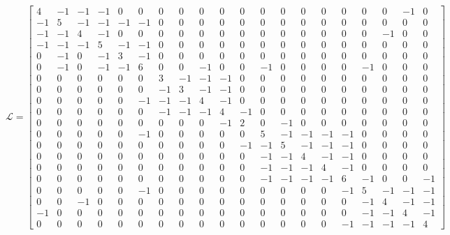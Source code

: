 \documentclass[a3paper,14pt]{extarticle}
\begin{document}
$$\mathcal{L} = \left[\begin{array}{rrrrrrrrrrrrrrrrrrrr}
    4 & -1 & -1 & -1 & 0 & 0 & 0 & 0 & 0 & 0 & 0 & 0 & 0 & 0 & 0 & 0 & 0 & 0 & -1 & 0 \\
    -1 & 5 & -1 & -1 & -1 & -1 & 0 & 0 & 0 & 0 & 0 & 0 & 0 & 0 & 0 & 0 & 0 & 0 & 0 & 0 \\
    -1 & -1 & 4 & -1 & 0 & 0 & 0 & 0 & 0 & 0 & 0 & 0 & 0 & 0 & 0 & 0 & 0 & -1 & 0 & 0 \\
    -1 & -1 & -1 & 5 & -1 & -1 & 0 & 0 & 0 & 0 & 0 & 0 & 0 & 0 & 0 & 0 & 0 & 0 & 0 & 0 \\
    0 & -1 & 0 & -1 & 3 & -1 & 0 & 0 & 0 & 0 & 0 & 0 & 0 & 0 & 0 & 0 & 0 & 0 & 0 & 0 \\
    0 & -1 & 0 & -1 & -1 & 6 & 0 & 0 & -1 & 0 & 0 & -1 & 0 & 0 & 0 & 0 & -1 & 0 & 0 & 0 \\
    0 & 0 & 0 & 0 & 0 & 0 & 3 & -1 & -1 & -1 & 0 & 0 & 0 & 0 & 0 & 0 & 0 & 0 & 0 & 0 \\
    0 & 0 & 0 & 0 & 0 & 0 & -1 & 3 & -1 & -1 & 0 & 0 & 0 & 0 & 0 & 0 & 0 & 0 & 0 & 0 \\
    0 & 0 & 0 & 0 & 0 & -1 & -1 & -1 & 4 & -1 & 0 & 0 & 0 & 0 & 0 & 0 & 0 & 0 & 0 & 0 \\
    0 & 0 & 0 & 0 & 0 & 0 & -1 & -1 & -1 & 4 & -1 & 0 & 0 & 0 & 0 & 0 & 0 & 0 & 0 & 0 \\
    0 & 0 & 0 & 0 & 0 & 0 & 0 & 0 & 0 & -1 & 2 & 0 & -1 & 0 & 0 & 0 & 0 & 0 & 0 & 0 \\
    0 & 0 & 0 & 0 & 0 & -1 & 0 & 0 & 0 & 0 & 0 & 5 & -1 & -1 & -1 & -1 & 0 & 0 & 0 & 0 \\
    0 & 0 & 0 & 0 & 0 & 0 & 0 & 0 & 0 & 0 & -1 & -1 & 5 & -1 & -1 & -1 & 0 & 0 & 0 & 0 \\
    0 & 0 & 0 & 0 & 0 & 0 & 0 & 0 & 0 & 0 & 0 & -1 & -1 & 4 & -1 & -1 & 0 & 0 & 0 & 0 \\
    0 & 0 & 0 & 0 & 0 & 0 & 0 & 0 & 0 & 0 & 0 & -1 & -1 & -1 & 4 & -1 & 0 & 0 & 0 & 0 \\
    0 & 0 & 0 & 0 & 0 & 0 & 0 & 0 & 0 & 0 & 0 & -1 & -1 & -1 & -1 & 6 & -1 & 0 & 0 & -1 \\
    0 & 0 & 0 & 0 & 0 & -1 & 0 & 0 & 0 & 0 & 0 & 0 & 0 & 0 & 0 & -1 & 5 & -1 & -1 & -1 \\
    0 & 0 & -1 & 0 & 0 & 0 & 0 & 0 & 0 & 0 & 0 & 0 & 0 & 0 & 0 & 0 & -1 & 4 & -1 & -1 \\
    -1 & 0 & 0 & 0 & 0 & 0 & 0 & 0 & 0 & 0 & 0 & 0 & 0 & 0 & 0 & 0 & -1 & -1 & 4 & -1 \\
    0 & 0 & 0 & 0 & 0 & 0 & 0 & 0 & 0 & 0 & 0 & 0 & 0 & 0 & 0 & -1 & -1 & -1 & -1 & 4
\end{array}\right]$$ 
\end{document}
